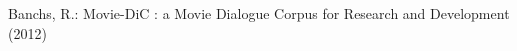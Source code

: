 \begin{thebibliography}{4}
%
Banchs, R.:
Movie-DiC : a Movie Dialogue Corpus for Research and Development (2012)

\end{thebibliography}